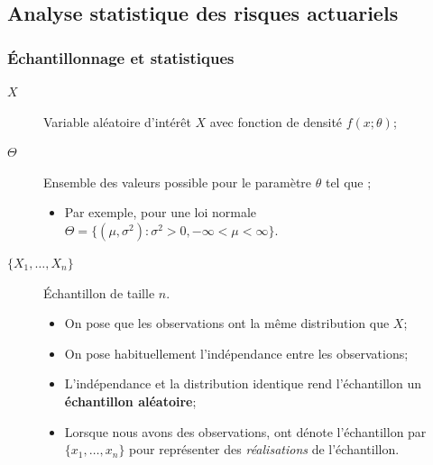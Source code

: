 \documentclass[10pt, french]{article}
\begin{document}
\newpage
\raggedcolumns
\begin{multicols*}{2}

\part{Analyse statistique des risques actuariels}
\label{chapt:stats}
\section{Échantillonnage et statistiques}
\begin{distributions}[Notation]
\begin{description}
	\item[$X$]	Variable aléatoire d'intérêt $X$ avec fonction de densité $f(x; \theta)$;
	\item[$\Theta$]	Ensemble des valeurs possible pour le paramètre $\theta$ tel que \lfbox[formula]{$\theta \in \Theta$};
		\begin{itemize}
		\item	Par exemple, pour une loi normale $\Theta	=	\{(\mu, \sigma^{2}): \sigma^{2} > 0, -\infty < \mu < \infty\}$.
		\end{itemize}
	\item[$\{X_{1}, \dots, X_{n}\}$]	Échantillon de taille $n$.
		\begin{itemize}
		\item	On pose que les observations ont la même distribution que $X$;
		\item	On pose habituellement l'indépendance entre les observations;
		\item	L'indépendance et la distribution identique rend l'échantillon un \textbf{échantillon aléatoire};
		\item	Lorsque nous avons des observations, ont dénote l'échantillon par $\{x_{1}, \dots, x_{n}\}$ pour représenter des \textit{réalisations} de l'échantillon.
		\end{itemize}
\end{description}
\end{distributions}





\end{multicols*}
\end{document}
